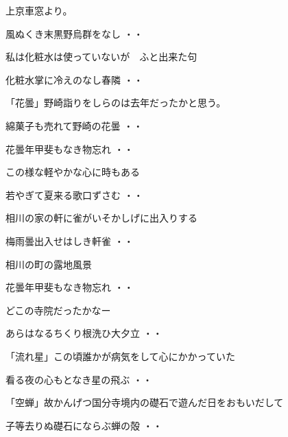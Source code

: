 \documentclass[b5paper]{tbook}
\begin{document}
\vspace{0.6cm}
上京車窓より。
\begin{shiika}風ぬくき末黒野烏群をなし
\hfill{・・}\end{shiika}
\vspace{0.6cm}
私は化粧水は使っていないが　ふと出来た句
\begin{shiika}化粧水掌に冷えのなし春隣
\hfill{・・}\end{shiika}
\vspace{0.6cm}
「花曇」野崎詣りをしらのは去年だったかと思う。
\begin{shiika}綿菓子も売れて野崎の花曇
\hfill{・・}\end{shiika}
\begin{shiika}花曇年甲斐もなき物忘れ
\hfill{・・}\end{shiika}
\vspace{0.6cm}
この様な軽やかな心に時もある
\begin{shiika}若やぎて夏来る歌口ずさむ
\hfill{・・}\end{shiika}
\vspace{0.6cm}
相川の家の軒に雀がいそかしげに出入りする
\begin{shiika}梅雨曇出入せはしき軒雀
\hfill{・・}\end{shiika}
\vspace{0.6cm}
相川の町の露地風景
\begin{shiika}花曇年甲斐もなき物忘れ
\hfill{・・}\end{shiika}
\vspace{0.6cm}
どこの寺院だったかなー
\begin{shiika}あらはなるちくり根洗ひ大夕立
\hfill{・・}\end{shiika}
\vspace{0.6cm}
「流れ星」この頃誰かが病気をして心にかかっていた
\begin{shiika}看る夜の心もとなき星の飛ぶ
\hfill{・・}\end{shiika}
\vspace{0.6cm}
「空蝉」故かんげつ国分寺境内の礎石で遊んだ日をおもいだして
\begin{shiika}子等去りぬ礎石にならぶ蝉の殻
\hfill{・・}\end{shiika}
\end{document}
